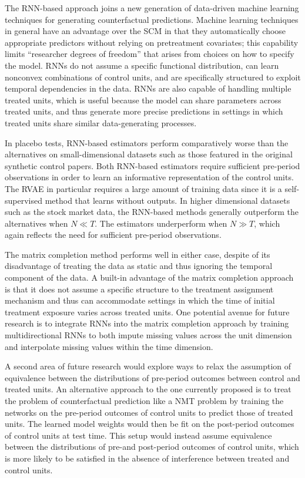 The RNN-based approach joins a new generation of data-driven machine learning techniques for generating counterfactual predictions. Machine learning techniques in general have an advantage over the SCM in that they automatically choose appropriate predictors without relying on pretreatment covariates; this capability limits ``researcher degrees of freedom'' that arises from choices on how to specify the model. RNNs do not assume a specific functional distribution, can learn nonconvex combinations of control units, and are specifically structured to exploit temporal dependencies in the data. RNNs are also capable of handling multiple treated units, which is useful because the model can share parameters across treated units, and thus generate more precise predictions in settings in which treated units share similar data-generating processes. 

In placebo tests, RNN-based estimators perform comparatively worse than the alternatives on small-dimensional datasets such as those featured in the original synthetic control papers. Both RNN-based estimators require sufficient pre-period observations in order to learn an informative representation of the control units. The RVAE in particular requires a large amount of training data since it is a self-supervised method that learns without outputs. In higher dimensional datasets such as the stock market data, the RNN-based methods generally outperform the alternatives when  $N \ll T$. The estimators underperform when $N \gg T$, which again reflects the need for sufficient pre-period observations. 

The matrix completion method performs well in either case, despite of its disadvantage of treating the data as static and thus ignoring the temporal component of the data. A built-in advantage of the matrix completion approach is that it does not assume a specific structure to the treatment assignment mechanism and thus can accommodate settings in which the time of initial treatment exposure varies across treated units. One potential avenue for future research is to integrate RNNs into the matrix completion approach by training multidirectional RNNs \citep[e.g.,][]{yoon2018estimating} to both impute missing values across the unit dimension and interpolate missing values within the time dimension. 

A second area of future research would explore ways to relax the assumption of equivalence between the distributions of pre-period outcomes between control and treated units. An alternative approach to the one currently proposed is to treat the problem of counterfactual prediction like a NMT problem by training the networks on the pre-period outcomes of control units to predict those of treated units. The learned model weights would then be fit on the post-period outcomes of control units at test time. This setup would instead assume equivalence between the distributions of pre-and post-period outcomes of control units, which is more likely to be satisfied in the absence of interference between treated and control units. 
